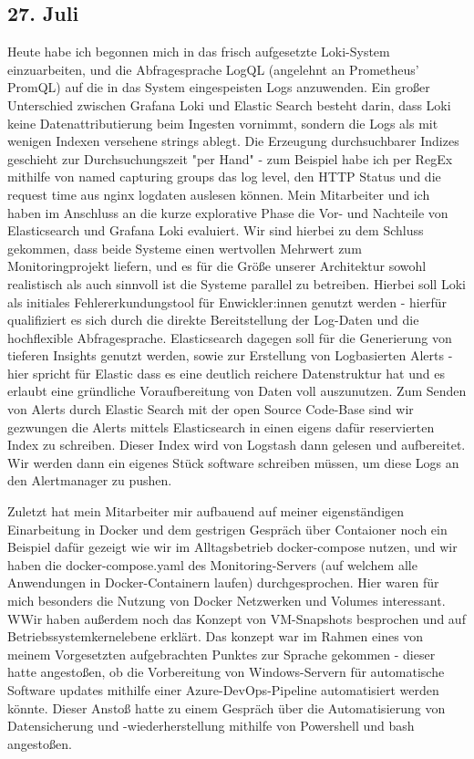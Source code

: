 \subsection{27. Juli}
Heute habe ich begonnen mich in das frisch aufgesetzte Loki-System einzuarbeiten, und die Abfragesprache LogQL (angelehnt an Prometheus' PromQL) auf die in das System eingespeisten Logs anzuwenden. Ein großer Unterschied zwischen Grafana Loki und Elastic Search besteht darin, dass Loki keine Datenattributierung beim Ingesten vornimmt, sondern die Logs als mit wenigen Indexen versehene strings ablegt. Die Erzeugung durchsuchbarer Indizes geschieht zur Durchsuchungszeit "per Hand" - zum Beispiel habe ich per RegEx mithilfe von named capturing groups das log level, den HTTP Status und die request time aus nginx logdaten auslesen können. Mein Mitarbeiter und ich haben im Anschluss an die kurze explorative Phase die Vor- und Nachteile von Elasticsearch und Grafana Loki evaluiert. Wir sind hierbei zu dem Schluss gekommen, dass beide Systeme einen wertvollen Mehrwert zum Monitoringprojekt liefern, und es für die Größe unserer Architektur sowohl realistisch als auch sinnvoll ist die Systeme parallel zu betreiben. Hierbei soll Loki als initiales Fehlererkundungstool für Enwickler:innen genutzt werden - hierfür qualifiziert es sich durch die direkte Bereitstellung der Log-Daten und die hochflexible Abfragesprache. Elasticsearch dagegen soll für die Generierung von tieferen Insights genutzt werden, sowie zur Erstellung von Logbasierten Alerts - hier spricht für Elastic dass es eine deutlich reichere Datenstruktur hat und es erlaubt eine gründliche Voraufbereitung von Daten voll auszunutzen. Zum Senden von Alerts durch Elastic Search mit der open Source Code-Base sind wir gezwungen die Alerts mittels Elasticsearch in einen eigens dafür reservierten Index zu schreiben. Dieser Index wird von Logstash dann gelesen und aufbereitet. Wir werden dann ein eigenes Stück software schreiben müssen, um diese Logs an den Alertmanager zu pushen. 

Zuletzt hat mein Mitarbeiter mir aufbauend auf meiner eigenständigen Einarbeitung in Docker und dem gestrigen Gespräch über Contaioner noch ein Beispiel dafür gezeigt wie wir im Alltagsbetrieb docker-compose nutzen, und wir haben die docker-compose.yaml des Monitoring-Servers (auf welchem alle Anwendungen in Docker-Containern laufen) durchgesprochen. Hier waren für mich besonders die Nutzung von Docker Netzwerken und Volumes interessant. WWir haben außerdem noch das Konzept von VM-Snapshots besprochen und auf Betriebssystemkernelebene erklärt. Das konzept war im Rahmen eines von meinem Vorgesetzten aufgebrachten Punktes zur Sprache gekommen - dieser hatte angestoßen, ob die Vorbereitung von Windows-Servern für automatische Software updates mithilfe einer Azure-DevOps-Pipeline automatisiert werden könnte. Dieser Anstoß hatte zu einem Gespräch über die Automatisierung von Datensicherung und -wiederherstellung mithilfe von Powershell und bash angestoßen.